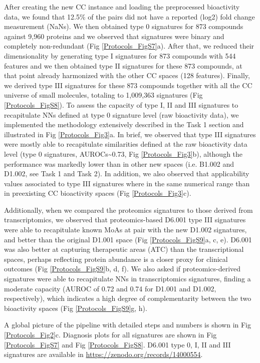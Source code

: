 After creating the new CC instance and loading the preprocessed bioactivity data, we found that 12.5\% of the pairs did not have a reported (log2) fold change measurement (NaNs). We then obtained type 0 signatures for 873 compounds against 9,960 proteins and we observed that signatures were binary and completely non-redundant (Fig \ref{Protocols_FigS7}a). After that, we reduced their dimensionality by generating type I signatures for 873 compounds with 544 features and we then obtained type II signatures for these 873 compounds, at that point already harmonized with the other CC spaces (128 features). Finally, we derived type III signatures for these 873 compounds together with all the CC universe of small molecules, totaling to 1,009,363 signatures (Fig \ref{Protocols_FigS8}). To assess the capacity of type I, II and III signatures to recapitulate NNs defined at type 0 signature level (raw bioactivity data), we implemented the methodology extensively described in the Task 1 section and illustrated in Fig \ref{Protocols_Fig3}a. In brief, we observed that type III signatures were mostly able to recapitulate similarities defined at the raw bioactivity data level (type 0 signatures, AUROCs\textasciitilde0.73, Fig \ref{Protocols_Fig3}b), although the performance was markedly lower than in other new spaces (i.e. B1.002 and D1.002, see Task 1 and Task 2). In addition, we also observed that applicability values associated to type III signatures where in the same numerical range than in preexisting CC bioactivity spaces (Fig \ref{Protocols_Fig3}c).


Additionally, when we compared the proteomics signatures to those derived from transcriptomics, we observed that proteomics-based D6.001 type III signatures were able to recapitulate known MoAs at pair with the new D1.002 signatures, and better than the original D1.001 space (Fig \ref{Protocols_FigS9}a, c, e). D6.001 was also better at capturing therapeutic areas (ATC) than the transcriptional spaces, perhaps reflecting protein abundance is a closer proxy for clinical outcomes (Fig \ref{Protocols_FigS9}b, d, f). We also asked if proteomics-derived signatures were able to recapitulate NNs in transcriptomics signatures, finding a moderate capacity (AUROC of 0.72 and 0.74 for D1.001 and D1.002, respectively), which indicates a high degree of complementarity between the two bioactivity spaces (Fig \ref{Protocols_FigS9}g, h).

A global picture of the pipeline with detailed steps and numbers is shown in Fig \ref{Protocols_Fig2}c. Diagnosis plots for all signatures are shown in Fig \ref{Protocols_FigS7} and Fig \ref{Protocols_FigS8}. D6.001 type 0, I, II and III signatures are available in \href{https://zenodo.org/records/14000554}{https://zenodo.org/records/14000554}. 

